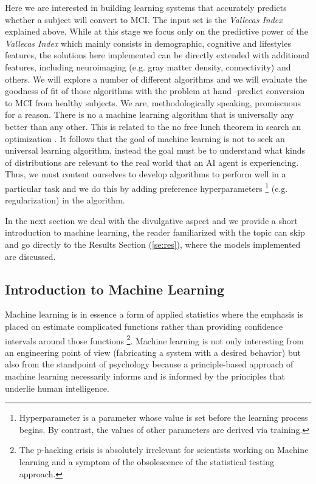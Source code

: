 \documentclass[11pt]{article}
\theoremstyle{definition}
\theoremstyle{remark}
\begin{document}
Here we are interested in building learning systems that accurately predicts whether a subject will convert to MCI. The input set is the \emph{Vallecas Index} explained above. While at this stage we focus only on the predictive power of the \emph{Vallecas Index} which mainly consists in demographic, cognitive and lifestyles features, the solutions here implemented can be directly extended with additional features, including neuroimaging (e.g. gray matter density, connectivity) and others.
We will explore a number of different algorithms and we will evaluate the goodness of fit of those algorithms with the problem at hand -predict conversion to MCI from healthy subjects. We are, methodologically speaking, promiscuous for a reason. There is no a machine learning algorithm that is universally any better than any other. This is related to the no free lunch theorem in search an optimization \cite{wolpert1997no}. It follows that the goal of machine learning is not to seek an universal learning algorithm, instead the goal must be to understand what kinds of distributions are relevant to the real world that an AI agent is experiencing. Thus, we must content ourselves to develop algorithms to perform well in a particular task and we do this by adding preference hyperparameters \footnote{Hyperparameter is a parameter whose value is set before the learning process begins. By contrast, the values of other parameters are derived via training.} (e.g. regularization) in the algorithm.  

In the next section we deal with the divulgative aspect and we provide a short introduction to machine learning, the reader familiarized with the topic can skip and go directly to the Results Section (\ref{se:res}), where the models implemented are discussed. 

\subsection{Introduction to Machine Learning} 
\label{sse:iml}
Machine learning is in essence a form of applied statistics where the emphasis is placed on estimate complicated functions rather than providing confidence intervals around those functions \footnote{The p-hacking crisis is absolutely irrelevant for scientists working on Machine learning and a symptom of the obsolescence of the statistical testing approach.}. Machine learning is not only interesting from an engineering point of view (fabricating a system with a desired behavior) but also from the standpoint of psychology because a principle-based approach of machine learning necessarily informs and is informed by the principles that underlie human intelligence.
\end{document}
